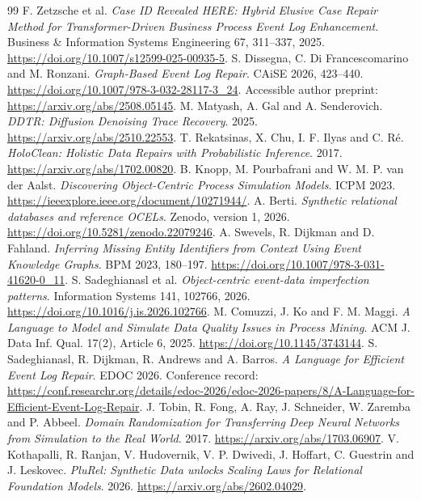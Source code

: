 \documentclass[11pt]{article}
\begin{document}
\begin{thebibliography}{99}
 F. Zetzsche et al. \emph{Case ID Revealed HERE: Hybrid Elusive Case Repair Method for Transformer-Driven Business Process Event Log Enhancement}. Business \& Information Systems Engineering 67, 311--337, 2025. \url{https://doi.org/10.1007/s12599-025-00935-5}.
 S. Dissegna, C. Di Francescomarino and M. Ronzani. \emph{Graph-Based Event Log Repair}. CAiSE 2026, 423--440. \url{https://doi.org/10.1007/978-3-032-28117-3_24}. Accessible author preprint: \url{https://arxiv.org/abs/2508.05145}.
 M. Matyash, A. Gal and A. Senderovich. \emph{DDTR: Diffusion Denoising Trace Recovery}. 2025. \url{https://arxiv.org/abs/2510.22553}.
 T. Rekatsinas, X. Chu, I. F. Ilyas and C. R\'e. \emph{HoloClean: Holistic Data Repairs with Probabilistic Inference}. 2017. \url{https://arxiv.org/abs/1702.00820}.
 B. Knopp, M. Pourbafrani and W. M. P. van der Aalst. \emph{Discovering Object-Centric Process Simulation Models}. ICPM 2023. \url{https://ieeexplore.ieee.org/document/10271944/}.
 A. Berti. \emph{Synthetic relational databases and reference OCELs}. Zenodo, version 1, 2026. \url{https://doi.org/10.5281/zenodo.22079246}.
 A. Swevels, R. Dijkman and D. Fahland. \emph{Inferring Missing Entity Identifiers from Context Using Event Knowledge Graphs}. BPM 2023, 180--197. \url{https://doi.org/10.1007/978-3-031-41620-0_11}.
 S. Sadeghianasl et al. \emph{Object-centric event-data imperfection patterns}. Information Systems 141, 102766, 2026. \url{https://doi.org/10.1016/j.is.2026.102766}.
 M. Comuzzi, J. Ko and F. M. Maggi. \emph{A Language to Model and Simulate Data Quality Issues in Process Mining}. ACM J. Data Inf. Qual. 17(2), Article 6, 2025. \url{https://doi.org/10.1145/3743144}.
 S. Sadeghianasl, R. Dijkman, R. Andrews and A. Barros. \emph{A Language for Efficient Event Log Repair}. EDOC 2026. Conference record: \url{https://conf.researchr.org/details/edoc-2026/edoc-2026-papers/8/A-Language-for-Efficient-Event-Log-Repair}.
 J. Tobin, R. Fong, A. Ray, J. Schneider, W. Zaremba and P. Abbeel. \emph{Domain Randomization for Transferring Deep Neural Networks from Simulation to the Real World}. 2017. \url{https://arxiv.org/abs/1703.06907}.
 V. Kothapalli, R. Ranjan, V. Hudovernik, V. P. Dwivedi, J. Hoffart, C. Guestrin and J. Leskovec. \emph{PluRel: Synthetic Data unlocks Scaling Laws for Relational Foundation Models}. 2026. \url{https://arxiv.org/abs/2602.04029}.

\end{thebibliography}
\end{document}
